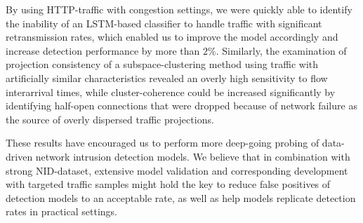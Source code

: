 \documentclass[runningheads]{llncs}
\begin{document}
By using HTTP-traffic with congestion settings, we were quickly able to identify the inability of an LSTM-based classifier to handle traffic with significant retransmission rates, which enabled us to improve the model accordingly and increase detection performance by more than $2\%$. Similarly, the examination of projection consistency of a subspace-clustering method using traffic with artificially similar characteristics revealed an overly high sensitivity to flow interarrival times, while cluster-coherence could be increased significantly by identifying half-open connections that were dropped because of network failure as the source of overly dispersed traffic projections. 

These results have encouraged us to perform more deep-going probing of data-driven network intrusion detection models. We believe that in combination with strong NID-dataset, extensive model validation and corresponding development with targeted traffic samples might hold the key to reduce false positives of detection models to an acceptable rate, as well as help models replicate detection rates in practical settings.




\end{document}
